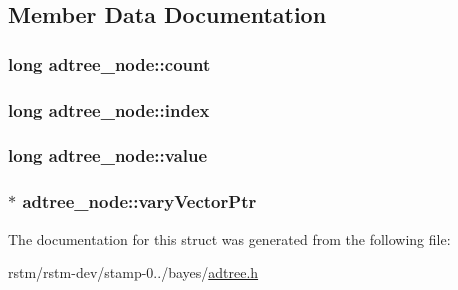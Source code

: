 \subsection{Member Data Documentation}
\hypertarget{structadtree__node_a0bafd7d0137d28c03ca2400cba80784b}{
\subsubsection[{count}]{\setlength{\rightskip}{0pt plus 5cm}long adtree\-\_\-node\-::count}}\label{structadtree__node_a0bafd7d0137d28c03ca2400cba80784b}
\hypertarget{structadtree__node_a822033e8f2411f77684f810697782cab}{
\subsubsection[{index}]{\setlength{\rightskip}{0pt plus 5cm}long adtree\-\_\-node\-::index}}\label{structadtree__node_a822033e8f2411f77684f810697782cab}
\hypertarget{structadtree__node_adc8e3d5e035961a09058d2a1b3e27695}{
\subsubsection[{value}]{\setlength{\rightskip}{0pt plus 5cm}long adtree\-\_\-node\-::value}}\label{structadtree__node_adc8e3d5e035961a09058d2a1b3e27695}
\hypertarget{structadtree__node_a04437090808b3b37786f9d804844185d}{
\subsubsection[{vary\-Vector\-Ptr}]{$\ast$ adtree\-\_\-node\-::vary\-Vector\-Ptr}}\label{structadtree__node_a04437090808b3b37786f9d804844185d}


The documentation for this struct was generated from the following file\-:\begin{DoxyCompactItemize}
\item 
rstm/rstm-\/dev/stamp-\/0../bayes/\hyperlink{adtree_8h}{adtree.\-h}\end{DoxyCompactItemize}
